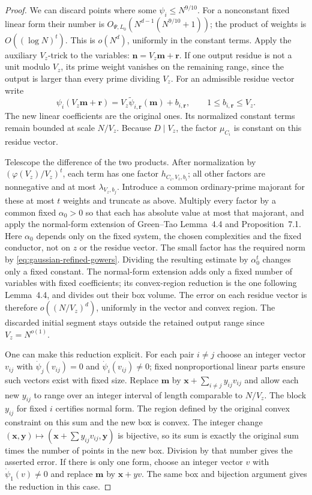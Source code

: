 \begin{proof}
We can discard points where some $\psi_i\leq N^{9/10}$.
For a nonconstant fixed linear form their number is
$O_{\Psi,L_0}(N^{d-1}(N^{9/10}+1))$; the product of weights is
$O((\log N)^t)$. This is $o(N^d)$, uniformly in the constant terms.
Apply the auxiliary $V_z$-trick to the variables:
$\mathbf n=V_z\mathbf m+\mathbf r$.
If one output residue is not a unit modulo $V_z$, its prime weight
vanishes on the remaining range, since the output is larger than
every prime dividing $V_z$. For an admissible residue vector write
\[
 \psi_i(V_z\mathbf m+\mathbf r)
       =V_z\widetilde\psi_{i,\mathbf r}(\mathbf m)+b_{i,\mathbf r},
       \qquad1\leq b_{i,\mathbf r}\leq V_z.
\]
The new linear coefficients are the original ones. Its normalized
constant terms remain bounded at scale $N/V_z$. Because $D\mid V_z$,
the factor $\mu_{C_i}$ is constant on this residue vector.

Telescope the difference of the two products. After normalization by
$(\varphi(V_z)/V_z)^t$, each term has one factor $h_{C_i,V_z,b_i}$;
all other factors are nonnegative and at most
$\lambda_{V_z,b_j}$. Introduce a common ordinary-prime majorant for
these at most $t$ weights and truncate as above. Multiply every
factor by a common fixed $\alpha_0>0$ so that each has absolute value
at most that majorant, and apply the normal-form extension of
Green--Tao Lemma~4.4 and Proposition~7.1. Here $\alpha_0$ depends
only on the fixed system, the chosen complexities and the fixed
conductor, not on $z$ or the residue vector. The small factor has
the required norm by \eqref{eq:gaussian-refined-gowers}. Dividing
the resulting estimate by $\alpha_0^t$ changes only a fixed constant.
The normal-form extension adds only a fixed number of variables with
fixed coefficients; its convex-region reduction is the one following
Lemma~4.4, and divides out their box volume. The error on each residue
vector is therefore $o((N/V_z)^d)$, uniformly in the vector and convex
region. The discarded initial segment stays outside the retained
output range since $V_z=N^{o(1)}$.

One can make this reduction explicit. For each pair $i\ne j$ choose
an integer vector $v_{ij}$ with $\dot\psi_j(v_{ij})=0$ and
$\dot\psi_i(v_{ij})\ne0$; fixed nonproportional linear parts ensure
such vectors exist with fixed size. Replace $\mathbf m$ by
$\mathbf x+\sum_{i\ne j}y_{ij}v_{ij}$ and allow each new $y_{ij}$
to range over an integer interval of length comparable to $N/V_z$.
The block $y_{ij}$ for fixed $i$ certifies normal form. The region
defined by the original convex constraint on this sum and the new box
is convex. The integer change $(\mathbf x,\mathbf y)\mapsto
(\mathbf x+\sum y_{ij}v_{ij},\mathbf y)$ is bijective, so its sum
is exactly the original sum times the number of points in the new box.
Division by that number gives the asserted error. If there is only one
form, choose an integer vector $v$ with $\dot\psi_1(v)\ne0$ and replace
$\mathbf m$ by $\mathbf x+yv$. The same box and bijection argument
gives the reduction in this case.


\end{proof}
